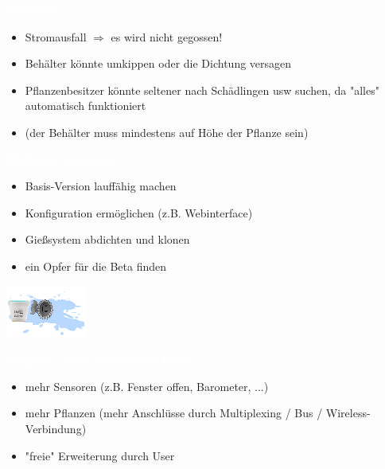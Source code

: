 \documentclass[bigger]{beamer}
\newcommand{\topic}[1]{{\huge{\textcolor{white}{\textbf{#1}}}}}
\begin{document}
\begin{frame}{\topic{Nachteile}}
	\begin{itemize}
		\item Stromausfall $\Rightarrow$ es wird nicht gegossen!
		\item Behälter könnte umkippen oder die Dichtung versagen
		\item Pflanzenbesitzer könnte seltener nach Schädlingen usw suchen, da "alles" automatisch funktioniert
		\item (der Behälter muss mindestens auf Höhe der Pflanze sein)
	\end{itemize}
\end{frame}


\begin{frame}{\topic{Weiteres Vorhaben}}
	\begin{itemize}
		\item Basis-Version lauffähig machen
		\item Konfiguration ermöglichen (z.B. Webinterface)
		\item Gießsystem abdichten und klonen
		\item ein Opfer für die Beta finden
	\end{itemize}
	\begin{flushright}
		\includegraphics[width=100px]{bloody2.png}
	\end{flushright}

\end{frame}


\begin{frame}{\topic{mögliche, nicht eingeplante Ideen}}
	\begin{itemize}
		\item mehr Sensoren (z.B. Fenster offen, Barometer, ...)
		\item mehr Pflanzen (mehr Anschlüsse durch Multiplexing / Bus / Wireless-Verbindung)
		\item "freie" Erweiterung durch User
	\end{itemize}
\end{frame}
\end{document}
